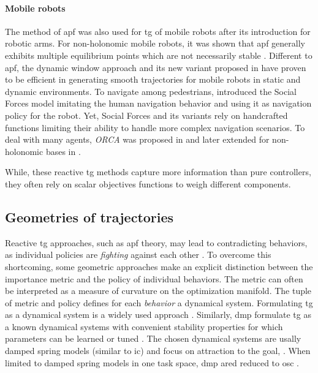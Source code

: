 \paragraph{Mobile robots}

The method of \ac{apf} was also used for \ac{tg} of mobile
robots after its introduction for robotic arms.
For non-holonomic mobile robots, it was shown that \ac{apf}
generally exhibits multiple equilibrium points which are not
necessarily stable \cite{urakubo2018stability}.
Different to \ac{apf}, the dynamic window approach
\cite{Fox1997} and its new variant proposed in
\cite{Zhang2019} have proven to be efficient in generating
smooth trajectories for mobile robots in static and dynamic
environments. To navigate among pedestrians,
\cite{Ferrer2013} introduced the Social Forces model
imitating the human navigation behavior and using it as
navigation policy for the robot.  Yet, Social Forces and its
variants rely on handcrafted functions limiting their
ability to handle more complex navigation scenarios. To deal
with many agents, \textit{ORCA} was proposed in
\cite{VanDenBerg2011} and later extended for non-holonomic
bases in \cite{Alonso-Mora2012a}.


While, these reactive \ac{tg} methods capture more
information than pure controllers, they often rely on 
scalar objectives functions to weigh different components.

\subsection{Geometries of trajectories}
\label{sec:geometries_of_trajectories}

Reactive \ac{tg} approaches, such as \ac{apf} theory,
may lead to contradicting behaviors, as individual policies
are \textit{fighting} against each other \cite{Ratliff2018}.
To overcome this shortcoming, some geometric approaches make
an explicit distinction between the importance metric and
the policy of individual behaviors. The metric can often be
interpreted as a measure of curvature on the optimization
manifold. The tuple of metric and policy defines
for each \textit{behavior} a dynamical system.
Formulating \ac{tg} as a dynamical system is a widely used
approach \cite{khansari2012dynamical,huber2023avoidance}.
Similarly, \ac{dmp} formulate \ac{tg} as a known dynamical
systems with convenient stability properties for which
parameters can be learned or tuned
\cite{saveriano2023dynamic,ijspeert2013dynamical}. The
chosen dynamical systems are usally damped spring models
(similar to \ac{ic}) and focus on attraction to the goal,
\cite{perez2023stable}. When limited to damped spring models
in one task space, \ac{dmp} ared reduced to \ac{osc}
\cite{Khatib1987a}.
%

